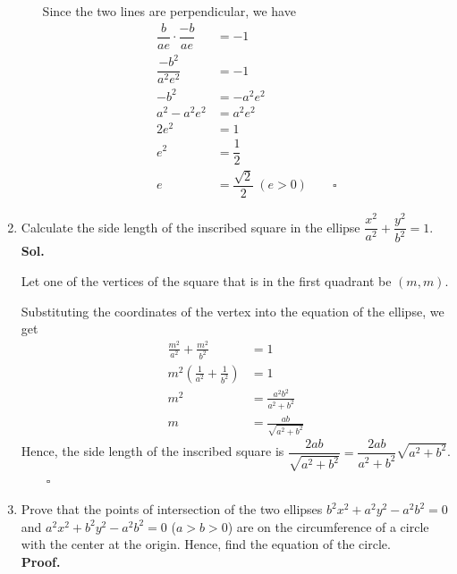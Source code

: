 \documentclass{report}
\newcommand{\sol}{\vspace{1em}\\\textbf{Sol.}}
\newcommand{\proof}{\vspace{1em}\\\textbf{Proof.}}
\newcommand{\eos}{ \qquad \square}
\begin{document}
\begin{enumerate}[leftmargin=*]
\begin{enumerate}
                    Since the two lines are perpendicular, we have
                    \begin{align*}
                        \dfrac{b}{ae} \cdot \dfrac{-b}{ae} & = -1                                \\
                        \dfrac{-b^2}{a^2e^2}               & = -1                                \\
                        -b^2                               & = -a^2e^2                           \\
                        a^2 - a^2e^2                       & = a^2e^2                            \\
                        2e^2                               & = 1                                 \\
                        e^2                                & = \dfrac{1}{2}                      \\
                        e                                  & = \dfrac{\sqrt{2}}{2}\ (e > 0) \eos
                    \end{align*}
          \end{enumerate}

    \item Calculate the side length of the inscribed square in the ellipse
          $\dfrac{x^2}{a^2} + \dfrac{y^2}{b^2} = 1$. \sol{}

          Let one of the vertices of the square that is in the first quadrant be $(m,
              m)$.

          Substituting the coordinates of the vertex into the equation of the ellipse, we
          get
          \begin{align*}
              \frac{m^2}{a^2} + \frac{m^2}{b^2}             & = 1                           \\
              m^2\left(\frac{1}{a^2} + \frac{1}{b^2}\right) & = 1                           \\
              m^2                                           & = \frac{a^2b^2}{a^2 + b^2}    \\
              m                                             & = \frac{ab}{\sqrt{a^2 + b^2}}
          \end{align*}
          Hence, the side length of the inscribed square is $\dfrac{2ab}{\sqrt{a^2 + b^2}} = \dfrac{2ab}{a^2 + b^2}\sqrt{a^2 + b^2}$. $\eos$

    \item Prove that the points of intersection of the two ellipses $b^2x^2 + a^2y^2 -
              a^2b^2 = 0$ and $a^2x^2 + b^2y^2 - a^2b^2 = 0$ ($a > b > 0$) are on the
          circumference of a circle with the center at the origin. Hence, find the
          equation of the circle. \proof{}


\end{enumerate}
\end{document}
